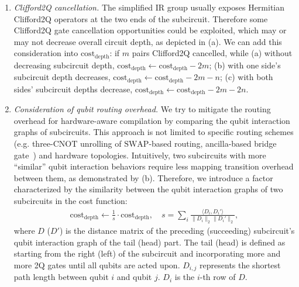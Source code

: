 \documentclass[conference,9pt]{IEEEtran}
\newcommand{\dquote}[1]{``#1''}
\newcommand{\SWAP}{\mathrm{SWAP}}
\newcommand{\CNOT}{\mathrm{CNOT}}
\begin{document}
\begin{enumerate}
        \item \emph{Clifford2Q cancellation.} The simplified IR group usually exposes Hermitian Clifford2Q operators at the two ends of the subcircuit. Therefore some Clifford2Q gate cancellation opportunities could be exploited, which may or may not decrease overall circuit depth, as depicted in  (a). We can add this consideration into $\mathrm{cost}_\mathrm{depth}$: if $m$ pairs Clifford2Q cancelled, while (a) without decreasing subcircuit depth, $\mathrm{cost}_\mathrm{depth} \gets \mathrm{cost}_\mathrm{depth} - 2m$; (b) with one side's subcircuit depth decreases, $\mathrm{cost}_\mathrm{depth} \gets \mathrm{cost}_\mathrm{depth} -2m -n$; (c) with both sides' subcircuit depths decrease, $\mathrm{cost}_\mathrm{depth} \gets \mathrm{cost}_\mathrm{depth} - 2m -2n$.
        \item \emph{Consideration of qubit routing overhead.} %
        We try to mitigate the routing overhead for hardware-aware compilation by comparing the qubit interaction graphs of subcircuits. This approach is not limited to specific routing schemes (e.g. three-$\CNOT$ unrolling of $\SWAP$-based routing, ancilla-based bridge gate~\cite{itoko2020optimization}) 
        and hardware topologies. Intuitively, two subcircuits with more \dquote{similar} qubit interaction behaviors require less mapping transition overhead between them, as demonstrated by  (b). Therefore, we introduce a factor characterized by the similarity between the qubit interaction graphs of two subcircuits in the cost function:
        \begin{align}
            \mathrm{cost}_\mathrm{depth} \gets \frac 1 s \cdot \mathrm{cost}_\mathrm{depth},\quad s = \sum\nolimits_i \frac{\langle D_i, D_i'\rangle}{\lVert D_i \rVert_2 \lVert D_i' \rVert_2},
        \end{align}
        where $D$ ($D'$) is the distance matrix of the preceding (succeeding) subcircuit's qubit interaction graph of the tail (head) part. The tail (head) is defined as starting from the right (left) of the subcircuit and incorporating more and more 2Q gates until all qubits are acted upon. $D_{i,j}$ represents the shortest path length between qubit $i$ and qubit $j$. $D_i$ is the $i$-th row of $D$.
    \end{enumerate}
\end{document}
